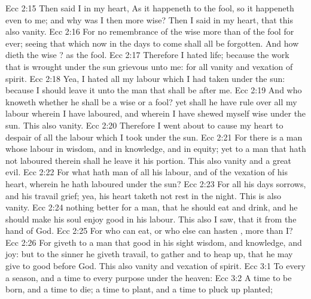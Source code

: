 \vs Ecc 2:15 Then said I in my heart, As it happeneth to the fool, so it happeneth even to me; and why was I then more wise? Then I said in my heart, that this also  vanity.
\vs Ecc 2:16 For  no remembrance of the wise more than of the fool for ever; seeing that which now  in the days to come shall all be forgotten. And how dieth the wise ? as the fool.
\vs Ecc 2:17 Therefore I hated life; because the work that is wrought under the sun  grievous unto me: for all  vanity and vexation of spirit.
\vs Ecc 2:18 Yea, I hated all my labour which I had taken under the sun: because I should leave it unto the man that shall be after me.
\vs Ecc 2:19 And who knoweth whether he shall be a wise  or a fool? yet shall he have rule over all my labour wherein I have laboured, and wherein I have shewed myself wise under the sun. This  also vanity.
\vs Ecc 2:20 Therefore I went about to cause my heart to despair of all the labour which I took under the sun.
\vs Ecc 2:21 For there is a man whose labour  in wisdom, and in knowledge, and in equity; yet to a man that hath not laboured therein shall he leave it  his portion. This also  vanity and a great evil.
\vs Ecc 2:22 For what hath man of all his labour, and of the vexation of his heart, wherein he hath laboured under the sun?
\vs Ecc 2:23 For all his days  sorrows, and his travail grief; yea, his heart taketh not rest in the night. This is also vanity.
\vs Ecc 2:24  nothing better for a man,  that he should eat and drink, and  he should make his soul enjoy good in his labour. This also I saw, that it  from the hand of God.
\vs Ecc 2:25 For who can eat, or who else can hasten , more than I?
\vs Ecc 2:26 For  giveth to a man that  good in his sight wisdom, and knowledge, and joy: but to the sinner he giveth travail, to gather and to heap up, that he may give to  good before God. This also  vanity and vexation of spirit.
\vs Ecc 3:1 To every  a season, and a time to every purpose under the heaven:
\vs Ecc 3:2 A time to be born, and a time to die; a time to plant, and a time to pluck up  planted;
